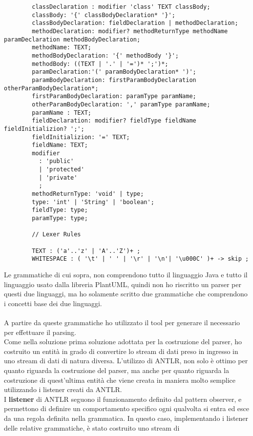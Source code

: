 \documentclass{article}
\begin{document}
\begin{itemize}
\begin{lstlisting}
        classDeclaration : modifier 'class' TEXT classBody;
        classBody: '{' classBodyDeclaration* '}';
        classBodyDeclaration: fieldDeclaration | methodDeclaration;
        methodDeclaration: modifier? methodReturnType methodName paramDeclaration methodBodyDeclaration;
        methodName: TEXT;
        methodBodyDeclaration: '{' methodBody '}';
        methodBody: ((TEXT | '.' | '=')* ';')*;
        paramDeclaration:'(' paramBodyDeclaration* ')';
        paramBodyDeclaration: firstParamBodyDeclaration otherParamBodyDeclaration*;
        firstParamBodyDeclaration: paramType paramName;
        otherParamBodyDeclaration: ',' paramType paramName;
        paramName : TEXT;
        fieldDeclaration: modifier? fieldType fieldName fieldInitializion? ';';
        fieldInitializion: '=' TEXT;
        fieldName: TEXT;
        modifier
          :	'public'
          |	'protected'
          |	'private'
          ;
        methodReturnType: 'void' | type;
        type: 'int' | 'String' | 'boolean';
        fieldType: type;
        paramType: type;

        // Lexer Rules

        TEXT : ('a'..'z' | 'A'..'Z')+ ;
        WHITESPACE : ( '\t' | ' ' | '\r' | '\n'| '\u000C' )+ -> skip ;
      \end{lstlisting}
  \end{itemize}
  Le grammatiche di cui sopra, non comprendono tutto il linguaggio Java e tutto il linguaggio usato dalla libreria PlantUML, quindi non ho riscritto un parser per
  questi due linguaggi, ma ho solamente scritto due grammatiche che comprendono i concetti base dei due linguaggi.\\
  \\A partire da queste grammatiche ho utilizzato il tool per generare il necessario per effettuare il parsing.\\
  Come nella soluzione prima soluzione adottata per la costruzione del parser, ho costruito un entità in grado di convertire lo stream di dati preso in ingresso
  in uno stream di dati di natura diversa. L'utilizzo di ANTLR, non solo è ottimo per quanto riguarda la costruzione del parser, ma anche per quanto riguarda
  la costruzione di quest'ultima entità che viene creata in maniera molto semplice utilizzando i listener creati da ANTLR.\\
  I \textbf{listener} di ANTLR seguono il funzionamento definito dal pattern observer, e permettono di definire un comportamento specifico ogni qualvolta si
  entra ed esce da una regola definita nella grammatica. In questo caso, implementando i listener delle relative grammatiche, è stato costruito uno stream di
\end{document}

